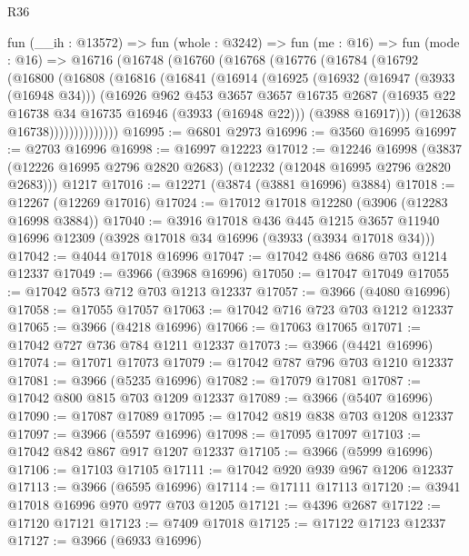 \begin{lexlean}{R36}
\begin{coremodule}
    fun (__ih : @13572) =>
    fun (whole : @3242) =>
    fun (me : @16) =>
    fun (mode : @16) =>
    @16716
      (@16748
        (@16760
          (@16768
            (@16776
              (@16784
                (@16792
                  (@16800
                    (@16808
                      (@16816
                        (@16841
                          (@16914
                            (@16925
                              (@16932
                                (@16947 (@3933 (@16948 @34)))
                                (@16926
                                  @962
                                  @453
                                  @3657
                                  @3657
                                  @16735
                                  @2687
                                  (@16935 @22 @16738 @34 @16735 @16946 (@3933 (@16948 @22)))
                                  (@3988 @16917)))
                              (@12638 @16738))))))))))))))
@16995 := @6801 @2973
@16996 := @3560 @16995
@16997 := @2703 @16996
@16998 := @16997 @12223
@17012 := @12246
    @16998
    (@3837 (@12226 @16995 @2796 @2820 @2683) (@12232 (@12048 @16995 @2796 @2820 @2683)))
    @1217
@17016 := @12271 (@3874 (@3881 @16996) @3884)
@17018 := @12267 (@12269 @17016)
@17024 := @17012 @17018 @12280 (@3906 (@12283 @16998 @3884))
@17040 := @3916
    @17018
    @436
    @445
    @1215
    @3657
    @11940
    @16996
    @12309
    (@3928 @17018 @34 @16996 (@3933 (@3934 @17018 @34)))
@17042 := @4044 @17018 @16996
@17047 := @17042 @486 @686 @703 @1214 @12337
@17049 := @3966 (@3968 @16996)
@17050 := @17047 @17049
@17055 := @17042 @573 @712 @703 @1213 @12337
@17057 := @3966 (@4080 @16996)
@17058 := @17055 @17057
@17063 := @17042 @716 @723 @703 @1212 @12337
@17065 := @3966 (@4218 @16996)
@17066 := @17063 @17065
@17071 := @17042 @727 @736 @784 @1211 @12337
@17073 := @3966 (@4421 @16996)
@17074 := @17071 @17073
@17079 := @17042 @787 @796 @703 @1210 @12337
@17081 := @3966 (@5235 @16996)
@17082 := @17079 @17081
@17087 := @17042 @800 @815 @703 @1209 @12337
@17089 := @3966 (@5407 @16996)
@17090 := @17087 @17089
@17095 := @17042 @819 @838 @703 @1208 @12337
@17097 := @3966 (@5597 @16996)
@17098 := @17095 @17097
@17103 := @17042 @842 @867 @917 @1207 @12337
@17105 := @3966 (@5999 @16996)
@17106 := @17103 @17105
@17111 := @17042 @920 @939 @967 @1206 @12337
@17113 := @3966 (@6595 @16996)
@17114 := @17111 @17113
@17120 := @3941 @17018 @16996 @970 @977 @703 @1205
@17121 := @4396 @2687
@17122 := @17120 @17121
@17123 := @7409 @17018
@17125 := @17122 @17123 @12337
@17127 := @3966 (@6933 @16996)

\end{coremodule}
\end{lexlean}
